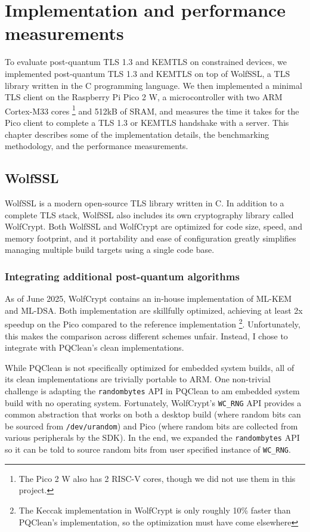 \documentclass[letterpaper,12pt,titlepage,oneside,final]{book}
\begin{document}
\chapter{Implementation and performance measurements}\label{sec:implementation-and-performance-measurements}
To evaluate post-quantum TLS 1.3 and KEMTLS on constrained devices, we implemented post-quantum TLS 1.3 and KEMTLS on top of WolfSSL, a TLS library written in the C programming language. We then implemented a minimal TLS client on the Raspberry Pi Pico 2 W, a microcontroller with two ARM Cortex-M33 cores \footnote{The Pico 2 W also has 2 RISC-V cores, though we did not use them in this project.} and 512kB of SRAM, and measures the time it takes for the Pico client to complete a TLS 1.3 or KEMTLS handshake with a server. This chapter describes some of the implementation details, the benchmarking methodology, and the performance measurements.

\section{WolfSSL}\label{sec:wolfssl}
WolfSSL is a modern open-source TLS library written in C. In addition to a complete TLS stack, WolfSSL also includes its own cryptography library called WolfCrypt. Both WolfSSL and WolfCrypt are optimized for code size, speed, and memory footprint, and it portability and ease of configuration greatly simplifies managing multiple build targets using a single code base.

\subsection{Integrating additional post-quantum algorithms}\label{sec:integrating-post-quantum-algorithms}
As of June 2025, WolfCrypt contains an in-house implementation of ML-KEM and ML-DSA. Both implementation are skillfully optimized, achieving at least 2x speedup on the Pico compared to the reference implementation \footnote{The Keccak implementation in WolfCrypt is only roughly 10\% faster than PQClean's implementation, so the optimization must have come elsewhere}. Unfortunately, this makes the comparison across different schemes unfair. Instead, I chose to integrate with PQClean's clean implementations.

While PQClean is not specifically optimized for embedded system builds, all of its clean implementations are trivially portable to ARM. One non-trivial challenge is adapting the \texttt{randombytes} API in PQClean to am embedded system build with no operating system. Fortunately, WolfCrypt's \texttt{WC\_RNG} API provides a common abstraction that works on both a desktop build (where random bits can be sourced from \texttt{/dev/urandom}) and Pico (where random bits are collected from various peripherals by the SDK). In the end, we expanded the \texttt{randombytes} API so it can be told to source random bits from user specified instance of \texttt{WC\_RNG}.
\end{document}
